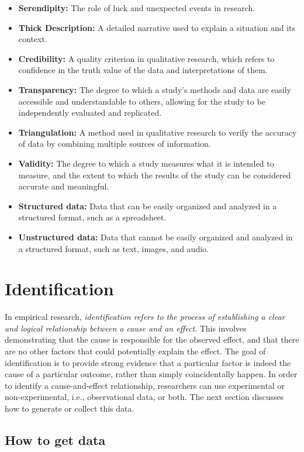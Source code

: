 \documentclass[
  12pt,
  oneside]{book}
\theoremstyle{definition}
\theoremstyle{definition}
\theoremstyle{definition}
\theoremstyle{definition}
\theoremstyle{remark}
\begin{document}
\begin{itemize}
\item
  \textbf{Serendipity:} The role of luck and unexpected events in research.
\item
  \textbf{Thick Description:} A detailed narrative used to explain a situation and its context.
\item
  \textbf{Credibility:} A quality criterion in qualitative research, which refers to confidence in the truth value of the data and interpretations of them.
\item
  \textbf{Transparency:} The degree to which a study's methods and data are easily accessible and understandable to others, allowing for the study to be independently evaluated and replicated.
\item
  \textbf{Triangulation:} A method used in qualitative research to verify the accuracy of data by combining multiple sources of information.
\item
  \textbf{Validity:} The degree to which a study measures what it is intended to measure, and the extent to which the results of the study can be considered accurate and meaningful.
\item
  \textbf{Structured data:} Data that can be easily organized and analyzed in a structured format, such as a spreadsheet.
\item
  \textbf{Unstructured data:} Data that cannot be easily organized and analyzed in a structured format, such as text, images, and audio.
\end{itemize}

\hypertarget{identification}{%
\chapter{Identification}\label{identification}}

In empirical research, \emph{identification refers to the process of establishing a clear and logical relationship between a cause and an effect}. This involves demonstrating that the cause is responsible for the observed effect, and that there are no other factors that could potentially explain the effect.
The goal of identification is to provide strong evidence that a particular factor is indeed the cause of a particular outcome, rather than simply coincidentally happen.
In order to identify a cause-and-effect relationship, researchers can use experimental or non-experimental, i.e., observational data, or both. The next section discusses how to generate or collect this data.

\hypertarget{how-to-get-data}{%
\section{How to get data}\label{how-to-get-data}}
\end{document}
